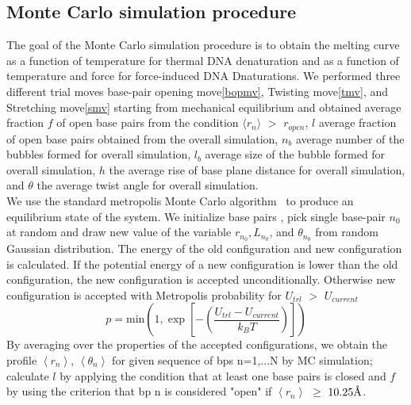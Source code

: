 \documentclass[12pt,masters,final]{UTRGVthesis}
\begin{document}
%

\subsection{Monte Carlo simulation procedure}
{\label{MCSP}}
The goal of the Monte Carlo simulation procedure is to obtain the melting curve as a function of temperature for thermal DNA denaturation and as a function of temperature and force for force-induced DNA Dnaturations. We performed three different trial moves base-pair opening move\ref{bopmv}, Twisting move\ref{tmv}, and Stretching move\ref{smv} starting from mechanical equilibrium and obtained average fraction $f$ of open base pairs  from the condition $\langle r_{n} \rangle $ $>$ $r_{open}$, $l$ average fraction of open base pairs obtained from the overall simulation, $n_{b}$ average number of the bubbles formed for overall simulation, $l_{b}$ average size of the bubble formed for overall simulation, $h$ the average rise of base plane distance for overall simulation, and $\theta$ the average twist angle for overall simulation. \\
\indent
We use the standard metropolis Monte Carlo algorithm~\cite{ares2005bubble,earl2008monte} to produce an equilibrium state of the system. We 
initialize base pairs , pick single base-pair $n_0$ at random and draw new value of the variable $r_{n_0}, L_{n_0}$, and $\theta_{n_0}$ from random Gaussian distribution. The energy of the old configuration and new configuration is calculated. If the potential energy of a new configuration is lower than the old configuration, the new configuration is accepted unconditionally. Otherwise new configuration is accepted with Metropolis probability for $U_{trl}$ $>$ $U_{current}$
% 
\begin{equation}\label{mpol}
p = \textrm{min}\left(1,\exp \left[-\left(\frac{U_{trl}-U_{current}}{k_BT} \right)\right] \right)
\end{equation}
%
By averaging over  the properties of the accepted configurations, we obtain the  profile  $\left\langle  r_{n} \right\rangle$, $\left\langle \theta_{n} \right\rangle$ for given sequence of bps n=1,...N by MC simulation; calculate $l$ by applying the condition that at least one base pairs is closed and $f$ by using the criterion that bp n is considered "open"  if $\left\langle r_{n} \right\rangle $ $\geq$ $10.25 \text{\normalfont\AA}$. \\
\end{document}
